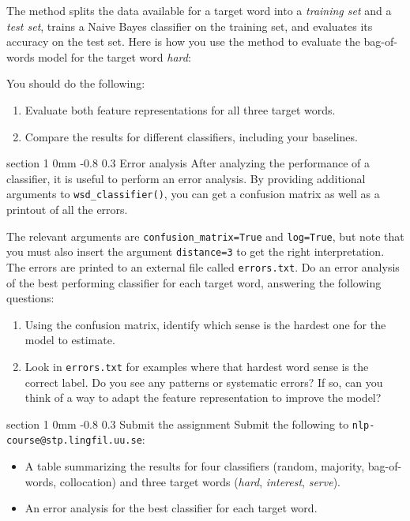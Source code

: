 \documentclass[11pt]{article}
\makeatletter
\newcommand{\newsec}[2]{\section{#1}\label{sec:#2}\noindent}
\renewcommand{\section}{\@startsection
{section}%
{1}%
{0mm}%
{-0.8\baselineskip}%
{0.3\baselineskip}%
{\bfseries\large}}%
\makeatother
\begin{document}
The method splits the data available for a target word into a {\em training set} and a {\em test set}, trains a Naive Bayes
classifier on the training set, and evaluates its accuracy on the test set. Here is how you use the method to evaluate
the bag-of-words model for the target word \emph{hard}:
\begin{center}
\fbox{
\scalebox{0.8}{

}}
\end{center}
You should do the following:
\begin{enumerate}[noitemsep,topsep=0.2cm]
\item Evaluate both feature representations for all three target words.
\item Compare the results for different classifiers, including your baselines.
\end{enumerate}

\newsec{Error analysis}{submit}%
After analyzing the performance of a classifier, it is useful to perform an error analysis. By providing additional arguments
to {\tt wsd\_classifier()}, you can get a confusion matrix as well as a printout of all the errors.
\begin{center}
\fbox{
\scalebox{0.55}{

}}
\end{center}
The relevant arguments are {\tt confusion\_matrix=True} and {\tt log=True}, but note that you must also insert the argument
{\tt distance=3} to get the right interpretation. The errors are printed to an external file called {\tt errors.txt}. Do an error analysis
of the best performing classifier for each target word, answering the following questions:
\begin{enumerate}
\item Using the confusion matrix, identify which sense is the hardest one for the model to estimate.
\item Look in {\tt errors.txt} for examples where that hardest word sense is the correct label. 
Do you see any patterns or systematic errors? If so, can you think of a way to adapt the feature representation to improve the model?
\end{enumerate}
\newsec{Submit the assignment}{submit}%
Submit the following to {\tt nlp-course@stp.lingfil.uu.se}: 
\begin{itemize}[noitemsep,topsep=0.2cm]
\item A table summarizing the results for four classifiers (random, majority, bag-of-words, collocation) and three target words
(\emph{hard}, \emph{interest}, \emph{serve}).
\item An error analysis for the best classifier for each target word.
\end{itemize}
\end{document}

